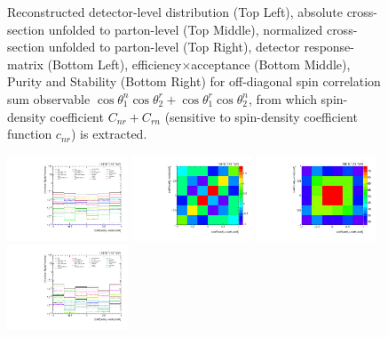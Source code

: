 \begin{refsection}
\begin{figure}[htb]
\begin{center}
\caption{Reconstructed detector-level distribution (Top Left), absolute cross-section unfolded to parton-level (Top Middle), normalized cross-section unfolded to parton-level (Top Right), detector response-matrix (Bottom Left), efficiency$\times$acceptance (Bottom Middle), Purity and Stability (Bottom Right) for off-diagonal spin correlation sum observable $\cos\theta_{1}^{n}\cos\theta_{2}^{r}+\cos\theta_{1}^{r}\cos\theta_{2}^{n}$, from which spin-density coefficient $C_{nr}+C_{rn}$ (sensitive to spin-density coefficient function $c_{n r}$) is extracted.}
\label{fig:c_Pnr}
\end{center}
\end{figure}
\clearpage
\begin{figure}[htb]
\begin{center}
 \includegraphics[width=0.32\textwidth]{fig_fullRun2UL/unfolding/combined/deltaSystCombinedlog_rebinnedB_c_Pnr.pdf}
 \includegraphics[width=0.32\textwidth]{fig_fullRun2UL/unfolding/combined/StatCovMatrix_rebinnedB_c_Pnr.pdf}
 \includegraphics[width=0.32\textwidth]{fig_fullRun2UL/unfolding/combined/TotalSystCovMatrix_rebinnedB_c_Pnr.pdf} \\
 \includegraphics[width=0.32\textwidth]{fig_fullRun2UL/unfolding/combined/deltaSystCombinedlogNorm_rebinnedB_c_Pnr.pdf}

\end{center}
\end{figure}
\end{refsection}
